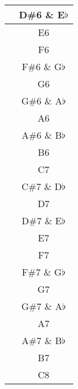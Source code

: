 \documentclass[twoside]{article}
\newcounter{rownumber}
\begin{document}
\begin{center}
\begin{supertabular}{>{\therownumber} c c}
     & D\#6 \& E$\flat$  \\ 
     \hline
     & E6 \\ 
     \hline
     & F6 \\ 
     \hline
     & F\#6 \& G$\flat$ \\ 
     \hline
     & G6 \\ 
     \hline
     & G\#6 \& A$\flat$ \\ 
     \hline
     & A6 \\ 
     \hline
     & A\#6 \& B$\flat$ \\ 
     \hline
     & B6 \\
     \hline
     & C7 \\ 
     \hline
     & C\#7 \& D$\flat$  \\ 
     \hline
     & D7  \\ 
     \hline
     & D\#7 \& E$\flat$  \\ 
     \hline
     & E7 \\ 
     \hline
     & F7 \\ 
     \hline
     & F\#7 \& G$\flat$ \\ 
     \hline
     & G7 \\ 
     \hline
     & G\#7 \& A$\flat$ \\ 
     \hline
     & A7 \\ 
     \hline
     & A\#7 \& B$\flat$ \\ 
     \hline
     & B7 \\ 
     \hline
     & C8 \\ 
     \hline
     
\end{supertabular}
\end{center}
\end{document}
